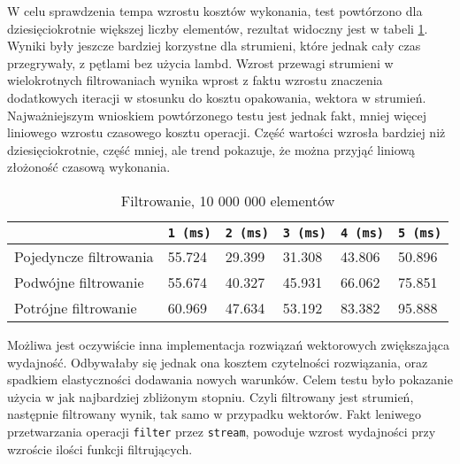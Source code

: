 \documentclass[a4paper,10pt]{report}
\begin{document}
W celu sprawdzenia tempa wzrostu kosztów wykonania, test powtórzono dla dziesięciokrotnie większej liczby elementów, rezultat widoczny jest w tabeli \ref{tab2}. Wyniki były jeszcze bardziej korzystne dla strumieni, które jednak cały czas przegrywały, z pętlami bez użycia lambd. Wzrost przewagi strumieni w wielokrotnych filtrowaniach wynika wprost z faktu wzrostu znaczenia dodatkowych iteracji w stosunku do kosztu opakowania, wektora w strumień. Najważniejszym wnioskiem powtórzonego testu jest jednak fakt, mniej więcej liniowego wzrostu czasowego kosztu operacji. Część wartości wzrosła bardziej niż dziesięciokrotnie, część mniej, ale trend pokazuje, że można przyjąć liniową złożoność czasową wykonania.
\begin{table}[t]
	\caption{Filtrowanie, 10 000 000 elementów}
	\label{tab2}
	\begin{tabular}{|l|l|l|l|l|l|}
		\hline 
		& \verb|1 (ms)| & \verb|2 (ms)| & \verb|3 (ms)| & \verb|4 (ms)| & \verb|5 (ms)|\\
		\hline
		Pojedyncze filtrowania & 55.724 & 29.399 & 31.308 &	43.806 & 50.896 \\
		\hline
		Podwójne filtrowanie & 55.674 & 40.327 & 45.931 & 66.062 & 75.851\\
		\hline
		Potrójne filtrowanie & 60.969 &	47.634 & 53.192	& 83.382 & 95.888 \\
		\hline
	\end{tabular} 
\end{table}
Możliwa jest oczywiście inna implementacja rozwiązań wektorowych zwiększająca wydajność. Odbywałaby się jednak ona kosztem czytelności rozwiązania, oraz spadkiem elastyczności dodawania nowych warunków. Celem testu było pokazanie użycia w jak najbardziej zbliżonym stopniu. Czyli filtrowany jest strumień, następnie filtrowany wynik, tak samo w przypadku wektorów. Fakt leniwego przetwarzania operacji \verb|filter| przez \verb|stream|, powoduje wzrost wydajności przy wzroście ilości funkcji filtrujących.
\end{document}
